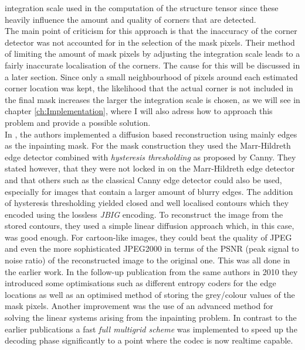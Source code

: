 integration scale used in the computation of the structure tensor since these heavily influence the
amount and quality of corners that are detected. \\
The main point of criticism for this approach is that the inaccuracy of the corner 
detector was not accounted for in the selection of the mask
pixels.\cite{conversation} Their method of limiting the amount of mask pixels by adjusting the integration scale leads
to a fairly inaccurate localisation of the corners. The cause for this will be discussed in
a later section.
Since only a small neighbourhood of pixels around each estimated corner
location was kept, the likelihood that the actual corner is not included in the final mask
increases the larger the integration scale is chosen, as we will see in chapter
\ref{ch:Implementation}, where I will also adress how to approach this problem and provide a
possible solution.\\


In \cite{mainberger09, mainberger10}, the authors implemented a diffusion based reconstruction
using mainly edges as the inpainting mask. For the mask construction they used the Marr-Hildreth
edge detector combined with \textit{hysteresis thresholding} as proposed by Canny\cite{canny86}.
They stated however, that they were not locked in on the Marr-Hildreth edge detector and that
others such as the classical Canny edge detector could also be used, especially for images that
contain a larger amount of blurry edges. The addition of hysteresis thresholding yielded closed and
well localised contours which they encoded using the lossless \textit{JBIG} encoding\cite{jbig}.
To reconstruct the image from the stored contours, they used a simple linear diffusion approach
which, in this case, was good enough. For cartoon-like images, they could beat the quality of
JPEG and even the more sophisticated JPEG2000 in terms of the PSNR (peak signal to noise ratio) of the reconstructed image to the
original one. This was all done in the earlier work\cite{mainberger09}. In the follow-up
publication from the same authors in 2010 they introduced some optimisations such as different
entropy coders for the edge locations as well as an optimised method of storing the grey/colour
values of the mask pixels. Another improvement was the use of an advanced method for solving the
linear systems arising from the inpainting problem. In contrast to the earlier publications a fast
\textit{full multigrid scheme} was implemented to speed up the decoding phase significantly to 
a point where the codec is now realtime capable.\\

